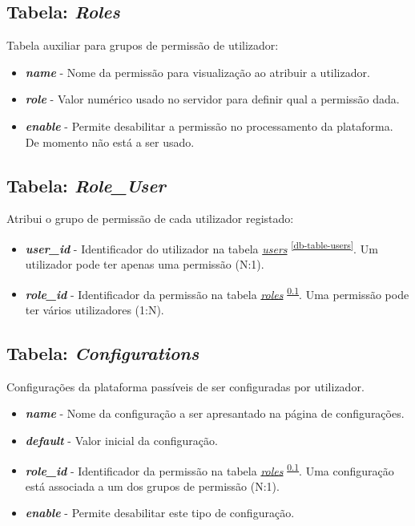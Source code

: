 \documentclass[11pt, a4paper, sans]{article}
\begin{document}
	\subsection{Tabela: \textit{Roles}} \label{db-table-roles}

	Tabela auxiliar para grupos de permissão de utilizador:

	\begin{itemize}
		\item \textbf{\textit{name}} - Nome da permissão para visualização ao atribuir a utilizador.
		\item \textbf{\textit{role}} - Valor numérico usado no servidor para definir qual a permissão dada.
		\item \textbf{\textit{enable}} - Permite desabilitar a permissão no processamento da plataforma. 
			De momento não está a ser usado.
	\end{itemize}

	\subsection{Tabela: \textit{Role\_User}} \label{db-table-role-user}

	Atribui o grupo de permissão de cada utilizador registado:

	\begin{itemize}
		\item \textbf{\textit{user\_id}} - Identificador do utilizador na tabela \underline{\textit{users}} \textsuperscript{\ref{db-table-users}}. Um utilizador pode ter apenas uma permissão (N:1).
		\item \textbf{\textit{role\_id}} - Identificador da permissão na tabela \underline{\textit{roles}} \textsuperscript{\ref{db-table-roles}}. Uma permissão pode ter vários utilizadores (1:N).
	\end{itemize}

	\subsection{Tabela: \textit{Configurations}} \label{db-table-configurations}

	Configurações da plataforma passíveis de ser configuradas por utilizador.

	\begin{itemize}
		\item \textbf{\textit{name}} - Nome da configuração a ser apresantado na página de configurações.
		\item \textbf{\textit{default}} - Valor inicial da configuração.
		\item \textbf{\textit{role\_id}} - Identificador da permissão na tabela \underline{\textit{roles}} \textsuperscript{\ref{db-table-roles}}. Uma configuração está associada a um dos grupos de permissão (N:1).
		\item \textbf{\textit{enable}} - Permite desabilitar este tipo de configuração.
	\end{itemize}
\end{document}
